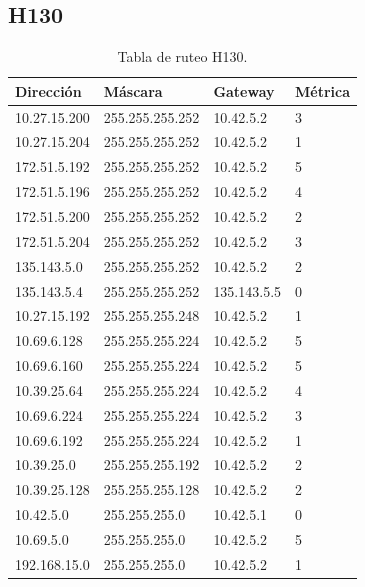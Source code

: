 \documentclass[12pt,titlepage]{article}
\begin{document}
\subsection{H130}
\begin{table}
  \begin{center}
    \begin{tabular}{|l|l|l|l|}
      \hline
        \bf{Direcci\'on} & \bf{M\'ascara} & \bf{Gateway} & \bf{M\'etrica} \\
      \hline 
	10.27.15.200  & 255.255.255.252 & 10.42.5.2 & 3 \\
        10.27.15.204  & 255.255.255.252 & 10.42.5.2 & 1 \\
        172.51.5.192  & 255.255.255.252 & 10.42.5.2 & 5 \\
        172.51.5.196  & 255.255.255.252 & 10.42.5.2 & 4 \\
        172.51.5.200  & 255.255.255.252 & 10.42.5.2 & 2 \\
        172.51.5.204  & 255.255.255.252 & 10.42.5.2 & 3 \\
        135.143.5.0   & 255.255.255.252 & 10.42.5.2 & 2 \\
        135.143.5.4   & 255.255.255.252 & 135.143.5.5 & 0 \\ 	
	10.27.15.192  & 255.255.255.248 & 10.42.5.2 & 1 \\
	10.69.6.128   & 255.255.255.224 & 10.42.5.2 & 5 \\
        10.69.6.160   & 255.255.255.224 & 10.42.5.2 & 5 \\
	10.39.25.64   & 255.255.255.224 & 10.42.5.2 & 4 \\       
	10.69.6.224   & 255.255.255.224 & 10.42.5.2 & 3 \\
	10.69.6.192   & 255.255.255.224 & 10.42.5.2 & 1 \\	
	10.39.25.0    & 255.255.255.192 & 10.42.5.2 & 2 \\
	10.39.25.128  & 255.255.255.128 & 10.42.5.2 & 2 \\
	10.42.5.0     & 255.255.255.0 & 10.42.5.1 & 0 \\
        10.69.5.0     & 255.255.255.0 & 10.42.5.2 & 5 \\
        192.168.15.0  & 255.255.255.0 & 10.42.5.2 & 1 \\  
    \hline
    \end{tabular} \\
  \end{center}
  \caption{Tabla de ruteo H130.}
\end{table}
\newpage
\end{document}
